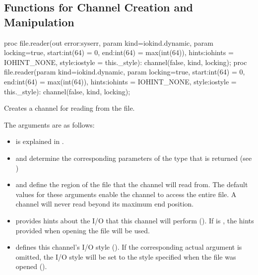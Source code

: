 \subsection{Functions for Channel Creation and Manipulation}
\label{IO_channel_creation}

\begin{protohead}
proc file.reader(out error:syserr, param kind=iokind.dynamic, param locking=true,
                 start:int(64) = 0, end:int(64) = max(int(64)), hints:iohints = IOHINT_NONE,
                 style:iostyle = this._style): channel(false, kind, locking);
proc file.reader(param kind=iokind.dynamic, param locking=true,
                 start:int(64) = 0, end:int(64) = max(int(64)), hints:iohints = IOHINT_NONE,
                 style:iostyle = this._style): channel(false, kind, locking);
\end{protohead}
\begin{protobody}
Creates a channel for reading from the file.

The arguments are as follows:

\begin{itemize}

\item {} is explained in .

\item {} and  determine the corresponding parameters of
      the  type that is returned (see )

\item {} and  define the region of the file that
      the channel will read from. The default values for these arguments enable
      the channel to access the entire file.
      A channel will never read beyond its maximum end position.

\item {} provides hints about the I/O that this channel
      will perform ().
      If  is , the hints provided when opening
      the file will be used.

\item {} defines this channel's I/O style ().
      If the corresponding actual argument is omitted,
      the I/O style will be set to the style specified when the file
      was opened ().

\end{itemize}

\end{protobody}

